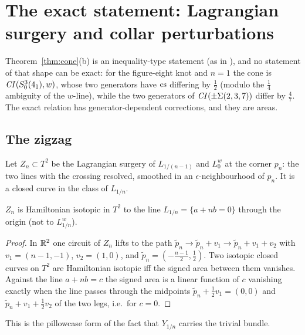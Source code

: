 \section{The exact statement: Lagrangian surgery and collar perturbations}\label{sec:exact}
Theorem~\ref{thm:cone}(b) is an inequality-type statement (as in \cite{DLM}), and no statement of that shape can
be exact: for the figure-eight knot and $n=1$ the cone is $\mathit{CI}(S^3_0(4_1),w)$, whose two generators have
$\mathrm{cs}$ differing by $\tfrac12$ (modulo the $\tfrac14$ ambiguity of the $w$-line), while the two generators of
$\mathit{CI}(\pm\Sigma(2,3,7))$ differ by $\tfrac47$.  The exact relation has generator-dependent corrections, and they
are areas.

\subsection{The zigzag}
Let $Z_n\subset T^2$ be the Lagrangian surgery of $L_{1/(n-1)}$ and $L^w_0$ at the corner $p_n$: the two lines with
the crossing resolved, smoothed in an $\epsilon$-neighbourhood of $p_n$.  It is a closed curve in the class of
$L_{1/n}$.

\begin{lemma}\label{lem:flux}
$Z_n$ is Hamiltonian isotopic in $T^2$ to the line $L_{1/n}=\{a+nb=0\}$ through the origin (not to $L^w_{1/n}$).
\end{lemma}
\begin{proof}
In $\mathbb{R}^2$ one circuit of $Z_n$ lifts to the path $\tilde p_n\to\tilde p_n+v_1\to\tilde p_n+v_1+v_2$ with
$v_1=(n-1,-1)$, $v_2=(1,0)$, and $\tilde p_n=(-\tfrac{n-1}2,\tfrac12)$.  Two isotopic closed curves on $T^2$ are
Hamiltonian isotopic iff the signed area between them vanishes.  Against the line $a+nb=c$ the signed area is a
linear function of $c$ vanishing exactly when the line passes through the midpoints $\tilde p_n+\tfrac12v_1=(0,0)$
and $\tilde p_n+v_1+\tfrac12v_2$ of the two legs, i.e.\ for $c=0$.
\end{proof}
This is the pillowcase form of the fact that $Y_{1/n}$ carries the trivial bundle.

